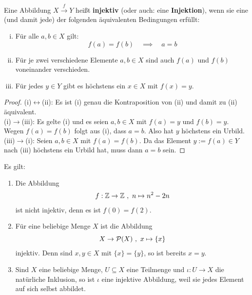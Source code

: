 \begin{defin} \label{def:injektiv} 
    Eine Abbildung $X \xrightarrow{f} Y$ heißt \textbf{injektiv} (oder auch: eine \textbf{Injektion}), wenn sie eine (und damit jede) der folgenden äquivalenten Bedingungen erfüllt:
    \begin{enumerate}[(i)]
        \item Für alle $a,b\in X$ gilt:
            \[ f(a)=f(b) \quad\implies\quad a=b \]
        \item Für je zwei verschiedene Elemente $a,b \in X$ sind auch $f(a)$ und $f(b)$ voneinander verschieden.
        \item Für jedes $y\in Y$ gibt es höchstens ein $x\in X$ mit $f(x)=y$.
    \end{enumerate}
\end{defin}
\begin{proof}
    (i)$\leftrightarrow$(ii): Es ist (i) genau die Kontraposition von (ii) und damit zu (ii) äquivalent. \\[0.5em]
    (i)$\rightarrow$(iii): Es gelte (i) und es seien $a,b\in X$ mit $f(a)=y$ und $f(b)=y$. Wegen $f(a)=f(b)$ folgt aus (i), dass $a=b$. Also hat $y$ höchstens ein Urbild. \\[0.5em]
    (iii)$\rightarrow$(i): Seien $a,b\in X$ mit $f(a)=f(b)$. Da das Element $y:=f(a)\in Y$ nach (iii) höchstens ein Urbild hat, muss dann $a=b$ sein.
\end{proof}


\begin{bsp} Es gilt:
    \begin{enumerate}
        \item Die Abbildung
            \[ f:\mathbb Z \to \mathbb Z \ ,\ n \mapsto n^2-2n \]
        ist nicht injektiv, denn es ist $f(0)=f(2)$.
        \item Für eine beliebige Menge $X$ ist die Abbildung
            \[ X \to \mathcal P(X) \ ,\ x \mapsto \{x\} \]
        injektiv. Denn sind $x,y\in X$ mit $\{x\}=\{y\}$, so ist bereits $x=y$.
        \item Sind $X$ eine beliebige Menge, $U\subseteq X$ eine Teilmenge und $\iota : U\to X$ die natürliche Inklusion, so ist $\iota$ eine injektive Abbildung, weil sie jedes Element auf sich selbst abbildet.
    \end{enumerate}
\end{bsp}
	

